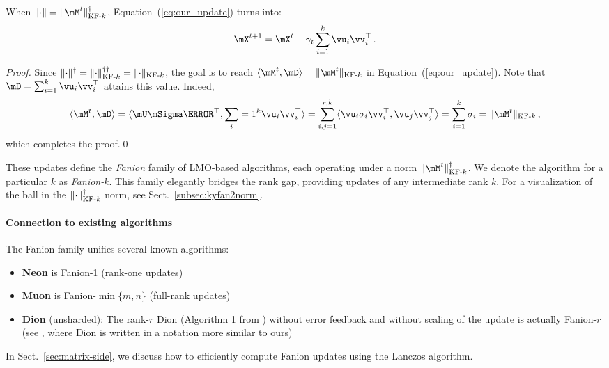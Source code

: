 \documentclass[smallextended,referee,envcountsect]{svjour3}
\newcommand{\norm}[1]{\lVert #1\rVert}
\DeclarePairedDelimiter{\normkfk}{\|}{\|_{\text{KF-}k}}
\def\<#1,#2>{\langle #1,#2\rangle}
\newcommand{\sectionref}[1]{Sect.~\ref{#1}}
\newcommand{\equationref}[1]{Equation~(\ref{#1})}
\begin{document}
 \begin{lemma}\label{lemma:ky_fan_update}
   When $\norm{\cdot} = \normkfk{\mM^t}^\dagger$, \equationref{eq:our_update} turns into:
   \begin{equation}\label{eq:ky_fan_update}
     \mX^{t+1} = \mX^{t} - \gamma_t \sum_{i=1}^{k}\vu_i \vv_i^\top\,.
   \end{equation}
 \end{lemma}
 
 \begin{proof}
 Since $\norm{\cdot}^\dagger = \normkfk{\cdot}^{\dagger\dagger} = \normkfk{\cdot}$, the goal is to reach $\<\mM^t, \mD> = \normkfk{\mM^t}$ in \equationref{eq:our_update}. Note that $\mD = \sum_{i=1}^{k} \vu_i \vv_i^\top$ attains this value. Indeed,
 \[
 \<\mM^t, \mD> =\<\mU \mSigma \mV^\top, \sum_{i=1}^{k} \vu_i \vv_i^\top> = \sum_{i,j=1}^{r, k}\<\vu_i \sigma_i \vv_i^\top, \vu_j \vv_j^\top> = \sum_{i=1}^{k}\sigma_i = \normkfk{\mM^t}\,,
 \]
 which completes the proof.\qed
\end{proof}
 
 These updates define the \emph{Fanion} family of LMO-based algorithms, each operating under a norm $\normkfk{\mM^t}^\dagger$. We denote the algorithm for a particular $k$ as \emph{Fanion-$k$}. This family elegantly bridges the rank gap, providing updates of any intermediate rank $k$. For a visualization of the ball in the $\normkfk{\cdot}^\dagger$ norm, see \sectionref{subsec:kyfan2norm}.
 
 \paragraph{Connection to existing algorithms}
 The Fanion family unifies several known algorithms:
 \begin{itemize}
   \item \textbf{Neon} is Fanion-1 (rank-one updates)
   \item \textbf{Muon} is Fanion-$\min\{m,n\}$ (full-rank updates)
   \item \textbf{Dion} (unsharded): The rank-$r$ Dion (Algorithm 1 from \citep{ahn2025dion}) without error feedback and without scaling of the update is actually Fanion-$r$ (see \citep{pethick2025understandingdion}, where Dion is written in a notation more similar to ours)
 \end{itemize}
 
 In \sectionref{sec:matrix-side}, we discuss how to efficiently compute Fanion updates using the Lanczos algorithm.
 
\end{document}
